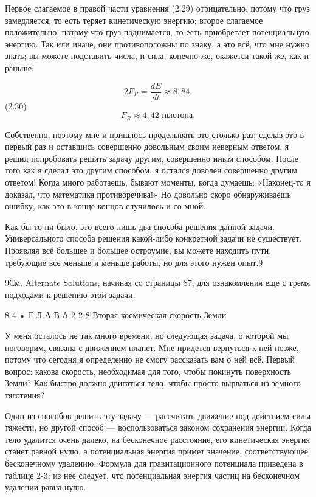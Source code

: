 \documentclass[10pt,oneside]{article}
\begin{document}
Первое слагаемое в правой части уравнения (2.29) отрицательно, потому что груз замедляется, то есть теряет кинетическую энергию; второе слагаемое положительно, потому что груз поднимается, то есть приобретает потенциальную энергию. Так или иначе, они противоположны по знаку, а это всё, что мне нужно знать; вы можете подставить числа, и сила, конечно же, окажется такой же, как и раньше:\par

\[2F_R = \frac{dE}{dt} \approx 8,84.\] (2.30) \[F_R \approx 4,42\text{ ньютона}.\]\par

Собственно, поэтому мне и пришлось проделывать это столько раз: сделав это в первый раз и оставшись совершенно довольным своим неверным ответом, я решил попробовать решить задачу другим, совершенно иным способом. После того как я сделал это другим способом, я остался доволен совершенно другим ответом! Когда много работаешь, бывают моменты, когда думаешь: «Наконец-то я доказал, что математика противоречива!» Но довольно скоро обнаруживаешь ошибку, как это в конце концов случилось и со мной.\par

Как бы то ни было, это всего лишь два способа решения данной задачи. Универсального способа решения какой-либо конкретной задачи не существует. Проявляя всё большее и большее остроумие, вы можете находить пути, требующие всё меньше и меньше работы, но для этого нужен опыт.9\par

9См. Alternate Solutions, начиная со страницы 87, для ознакомления еще с тремя подходами к решению этой задачи.\par

8 4 • Г Л А В А  2 2-8 Вторая космическая скорость Земли\par

У меня осталось не так много времени, но следующая задача, о которой мы поговорим, связана с движением планет. Мне придется вернуться к ней позже, потому что сегодня я определенно не смогу рассказать вам о ней всё. Первый вопрос: какова скорость, необходимая для того, чтобы покинуть поверхность Земли? Как быстро должно двигаться тело, чтобы просто вырваться из земного тяготения?\par

Один из способов решить эту задачу --- рассчитать движение под действием силы тяжести, но другой способ --- воспользоваться законом сохранения энергии. Когда тело удалится очень далеко, на бесконечное расстояние, его кинетическая энергия станет равной нулю, а потенциальная энергия примет значение, соответствующее бесконечному удалению. Формула для гравитационного потенциала приведена в таблице 2-3; из нее следует, что потенциальная энергия частиц на бесконечном удалении равна нулю.\par
\end{document}
